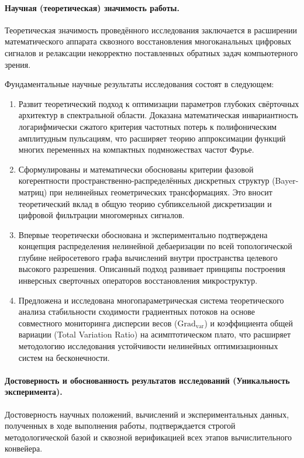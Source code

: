 \documentclass[12pt,a4paper]{article}
\begin{document}
\paragraph{Научная (теоретическая) значимость работы.} 
Теоретическая значимость проведённого исследования заключается в расширении математического аппарата сквозного восстановления многоканальных цифровых сигналов и релаксации некорректно поставленных обратных задач компьютерного зрения.

Фундаментальные научные результаты исследования состоят в следующем:
\begin{enumerate}
    \item Развит теоретический подход к оптимизации параметров глубоких свёрточных архитектур в спектральной области. Доказана математическая инвариантность логарифмически сжатого критерия частотных потерь к полифоническим амплитудным пульсациям, что расширяет теорию аппроксимации функций многих переменных на компактных подмножествах частот Фурье.
    \item Сформулированы и математически обоснованы критерии фазовой когерентности пространственно-распределённых дискретных структур (Bayer-матриц) при нелинейных геометрических трансформациях. Это вносит теоретический вклад в общую теорию субпиксельной дискретизации и цифровой фильтрации многомерных сигналов.
    \item Впервые теоретически обоснована и экспериментально подтверждена концепция распределения нелинейной дебаеризации по всей топологической глубине нейросетевого графа вычислений внутри пространства целевого высокого разрешения. Описанный подход развивает принципы построения инверсных сверточных операторов восстановления микроструктур.
    \item Предложена и исследована многопараметрическая система теоретического анализа стабильности сходимости градиентных потоков на основе совместного мониторинга дисперсии весов ($\text{Grad}_{\text{var}}$) и коэффициента общей вариации (Total Variation Ratio) на асимптотическом плато, что расширяет методологию исследования устойчивости нелинейных оптимизационных систем на бесконечности.
\end{enumerate}

\paragraph{Достоверность и обоснованность результатов исследований (Уникальность эксперимента).} 
Достоверность научных положений, вычислений и экспериментальных данных, полученных в ходе выполнения работы, подтверждается строгой методологической базой и сквозной верификацией всех этапов вычислительного конвейера.
\end{document}
